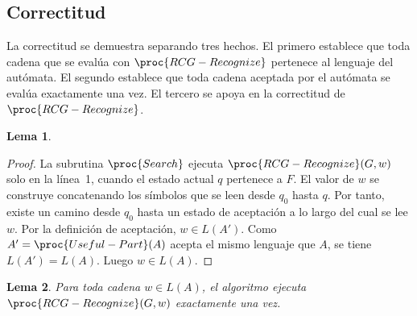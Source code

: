 \documentclass{report}
\theoremstyle{definition}
\theoremstyle{plain}
\newtheorem{lema}{Lema}[chapter]
\theoremstyle{remark}
\begin{document}
\subsection{Correctitud}
\label{sec:correctitud-algoritmo}

La correctitud se demuestra separando tres hechos. El primero establece
que toda cadena que se evalúa con $\proc{RCG-Recognize}$ pertenece al
lenguaje del autómata. El segundo establece que toda cadena aceptada por
el autómata se evalúa exactamente una vez. El tercero se apoya en la
correctitud de $\proc{RCG-Recognize}$.

\begin{lema}
  \label{lema:sonido-automata}
\end{lema}

\begin{proof}
  La subrutina $\proc{Search}$ ejecuta $\proc{RCG-Recognize}(G,w)$ solo en
  la línea~1, cuando el estado actual $q$ pertenece a $F$. El valor de $w$
  se construye concatenando los símbolos que se leen desde $q_0$ hasta
  $q$. Por tanto, existe un camino desde $q_0$ hasta un estado de
  aceptación a lo
  largo del cual se lee $w$. Por la definición de aceptación,
  $w \in L(A')$. Como $A'=\proc{Useful-Part}(A)$ acepta el mismo lenguaje
  que $A$, se tiene $L(A')=L(A)$. Luego $w \in L(A)$.
\end{proof}

\begin{lema}
  \label{lema:completo-automata}
  Para toda cadena $w \in L(A)$, el algoritmo ejecuta
  $\proc{RCG-Recognize}(G,w)$ exactamente una vez.
\end{lema}
\end{document}
